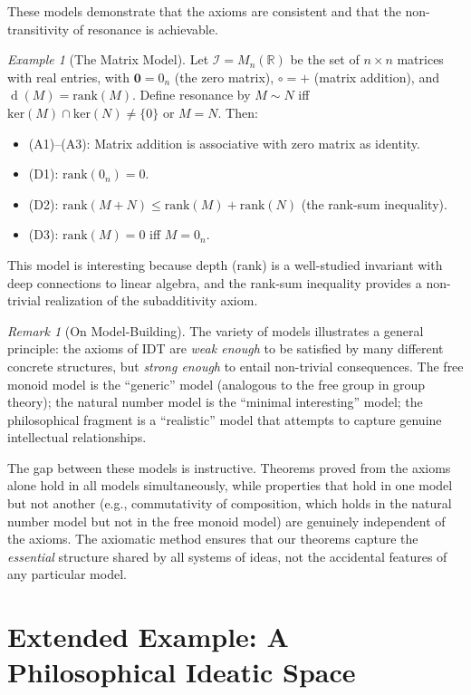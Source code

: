 \documentclass[11pt,openany]{book}
\theoremstyle{definition}
\theoremstyle{plain}
\theoremstyle{remark}
\newtheorem{remark}[axiom]{Remark}
\newtheorem{example}[axiom]{Example}
\newcommand{\IS}{\mathcal{I}}               %
\newcommand{\compose}{\circ}                 %
\newcommand{\void}{\mathbf{0}}              %
\newcommand{\res}{\sim}                      %
\newcommand{\depth}{\operatorname{d}}       %
\begin{document}
These models demonstrate that the axioms are consistent and that the non-transitivity of resonance is achievable.

\begin{example}[The Matrix Model]
Let $\IS = M_n(\mathbb{R})$ be the set of $n \times n$ matrices with real entries, with $\void = 0_n$ (the zero matrix), $\compose = +$ (matrix addition), and $\depth(M) = \mathrm{rank}(M)$. Define resonance by $M \res N$ iff $\mathrm{ker}(M) \cap \mathrm{ker}(N) \neq \{0\}$ or $M = N$. Then:
\begin{itemize}
\item (A1)--(A3): Matrix addition is associative with zero matrix as identity.
\item (D1): $\mathrm{rank}(0_n) = 0$.
\item (D2): $\mathrm{rank}(M + N) \leq \mathrm{rank}(M) + \mathrm{rank}(N)$ (the rank-sum inequality).
\item (D3): $\mathrm{rank}(M) = 0$ iff $M = 0_n$.
\end{itemize}
This model is interesting because depth (rank) is a well-studied invariant with deep connections to linear algebra, and the rank-sum inequality provides a non-trivial realization of the subadditivity axiom.
\end{example}

\begin{remark}[On Model-Building]
The variety of models illustrates a general principle: the axioms of IDT are \emph{weak enough} to be satisfied by many different concrete structures, but \emph{strong enough} to entail non-trivial consequences. The free monoid model is the ``generic'' model (analogous to the free group in group theory); the natural number model is the ``minimal interesting'' model; the philosophical fragment is a ``realistic'' model that attempts to capture genuine intellectual relationships.

The gap between these models is instructive. Theorems proved from the axioms alone hold in all models simultaneously, while properties that hold in one model but not another (e.g., commutativity of composition, which holds in the natural number model but not in the free monoid model) are genuinely independent of the axioms. The axiomatic method ensures that our theorems capture the \emph{essential} structure shared by all systems of ideas, not the accidental features of any particular model.
\end{remark}

\section{Extended Example: A Philosophical Ideatic Space}
\end{document}
